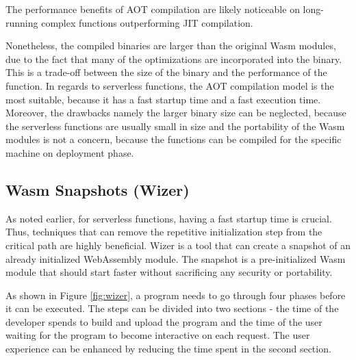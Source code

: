 The performance benefits of AOT compilation are likely noticeable on long-running complex functions outperforming JIT compilation.

Nonetheless, the compiled binaries are larger than the original Wasm modules, due to the fact that many of the optimizations are incorporated into the binary. This is a trade-off between the size of the binary and the performance of the function. 
In regards to serverless functions, the AOT compilation model is the most suitable, because it has a fast startup time and a fast execution time. Moreover, the drawbacks namely the larger binary size can be neglected, because the serverless functions are usually small in size and the portability of the Wasm modules is not a concern, because the functions can be compiled for the specific machine on deployment phase.

\subsection{Wasm Snapshots (Wizer)}
\label{sec:wizer}

As noted earlier, for \gls{serverless} functions, having a fast startup time is crucial. 
Thus, techniques that can remove the repetitive initialization step from the critical 
path are highly beneficial. Wizer is a tool that can create a snapshot of an already 
initialized WebAssembly module. The snapshot is a pre-initialized Wasm module that should start 
faster without sacrificing any security or portability. 

As shown in Figure \ref{fig:wizer}, a program needs to go through four phases before it can be executed. 
The steps can be divided into two sections - the time of the developer spends to build and upload the program and the time of the user waiting for the program to become interactive on each request. The user experience can be enhanced by reducing the time spent in the second section. 

